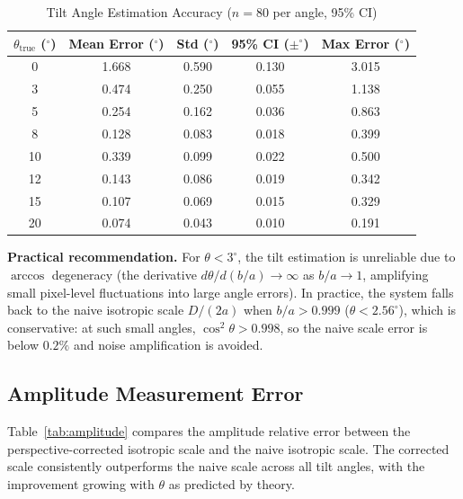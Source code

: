 \documentclass[journal]{IEEEtran}
\begin{document}
\begin{table}[!t]
\centering
\caption{Tilt Angle Estimation Accuracy ($n=80$ per angle, 95\% CI)}
\label{tab:tilt}
\begin{tabular}{ccccc}
\toprule
$\theta_{\text{true}}$ ($^{\circ}$) & Mean Error ($^{\circ}$) & Std ($^{\circ}$) & 95\% CI ($\pm^{\circ}$) & Max Error ($^{\circ}$) \\
\midrule
0   & 1.668 & 0.590 & 0.130 & 3.015 \\
3   & 0.474 & 0.250 & 0.055 & 1.138 \\
5   & 0.254 & 0.162 & 0.036 & 0.863 \\
8   & 0.128 & 0.083 & 0.018 & 0.399 \\
10  & 0.339 & 0.099 & 0.022 & 0.500 \\
12  & 0.143 & 0.086 & 0.019 & 0.342 \\
15  & 0.107 & 0.069 & 0.015 & 0.329 \\
20  & 0.074 & 0.043 & 0.010 & 0.191 \\
\bottomrule
\end{tabular}
\end{table}

\textbf{Practical recommendation.} For $\theta < 3^{\circ}$, the tilt
estimation is unreliable due to $\arccos$ degeneracy (the derivative
$d\theta/d(b/a) \to \infty$ as $b/a \to 1$, amplifying small pixel-level
fluctuations into large angle errors). In practice, the system falls
back to the naive isotropic scale $D/(2a)$ when $b/a > 0.999$ ($\theta
< 2.56^{\circ}$), which is conservative: at such small angles,
$\cos^{2}\theta > 0.998$, so the naive scale error is below $0.2\%$ and
noise amplification is avoided.

\subsection{Amplitude Measurement Error}

Table~\ref{tab:amplitude} compares the amplitude relative error between the
perspective-corrected isotropic scale and the naive isotropic scale. The
corrected scale consistently outperforms the naive scale across all tilt
angles, with the improvement growing with $\theta$ as predicted by theory.
\end{document}
